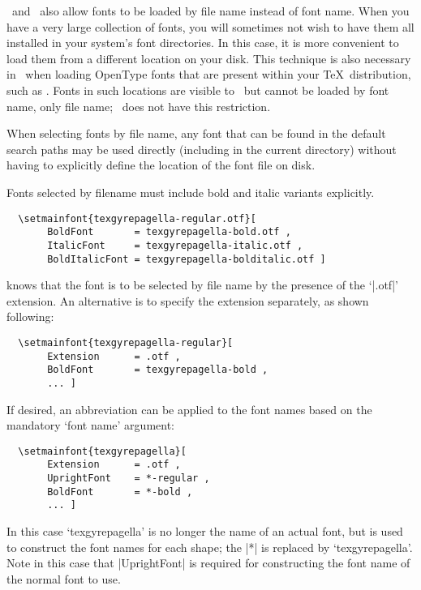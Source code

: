 \documentclass[a4paper]{l3doc}
\begin{document}
\XeTeX\ and \LuaTeX\ also allow fonts to be loaded by file name instead of font name.
When you have a very large collection of fonts, you will sometimes not
wish to have them all installed in your system's font directories.
In this case, it is more convenient to load them from a different location on your disk.
This technique is also necessary in \XeTeX\ when loading OpenType fonts that are present within your \TeX\ distribution, such as .
Fonts in such locations are visible to \XeTeX\ but cannot be loaded by font name, only file name; \LuaTeX\ does not have this restriction.

When selecting fonts by file name, any font that can be found in the default
search paths may be used directly (including in the current directory)
without having to explicitly define the location of the font file on disk.

Fonts selected by filename must include bold and italic variants explicitly.
\begin{Verbatim}
  \setmainfont{texgyrepagella-regular.otf}[
       BoldFont       = texgyrepagella-bold.otf ,
       ItalicFont     = texgyrepagella-italic.otf ,
       BoldItalicFont = texgyrepagella-bolditalic.otf ]
\end{Verbatim}
 knows that the font is to be selected by file name by the
presence of the `|.otf|' extension.
An alternative is to specify the extension separately, as shown following:
\begin{Verbatim}
  \setmainfont{texgyrepagella-regular}[
       Extension      = .otf ,
       BoldFont       = texgyrepagella-bold ,
       ... ]
\end{Verbatim}
If desired, an abbreviation can be applied to the font names based on the
mandatory `font name' argument:
\begin{Verbatim}
  \setmainfont{texgyrepagella}[
       Extension      = .otf ,
       UprightFont    = *-regular ,
       BoldFont       = *-bold ,
       ... ]
\end{Verbatim}
In this case `texgyrepagella' is no longer the name of an actual font,
but is used to construct the font names for each shape;
the |*| is replaced by `texgyrepagella'.
Note in this case that |UprightFont| is required for constructing the font
name of the normal font to use.
\end{document}
